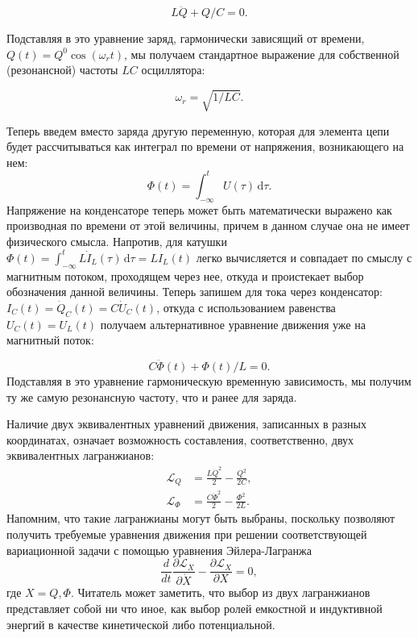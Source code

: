\documentclass[14pt, a4paper]{extreport}
\newcommand{\diff}{\,\mathrm{d}}
\numberwithin{equation}{section}
\begin{document}
\begin{equation}
L \ddot Q + Q/C = 0.
\end{equation}

Подставляя в это уравнение заряд, гармонически зависящий от времени, $Q(t) = Q^0 \cos(\omega_r t)$, мы получаем стандартное выражение для собственной (резонансной) частоты $LC$ осциллятора:

\begin{equation}
	\omega_r = \sqrt{1/LC}.
\end{equation}

Теперь введем вместо заряда другую переменную, которая для элемента цепи будет рассчитываться как интеграл по времени от напряжения, возникающего на нем:
\begin{equation}
	\Phi(t) = \int_{-\infty}^{t} U(\tau) \diff \tau.
\end{equation}
Напряжение на конденсаторе теперь может быть математически выражено как производная по времени от этой величины, причем в данном случае она не имеет физического смысла. Напротив, для катушки $\Phi(t) = \int_{-\infty}^{t} L \dot I_L(\tau) \diff \tau = LI_L(t)	$  легко вычисляется и совпадает по смыслу с магнитным потоком, проходящем через нее, откуда и проистекает выбор обозначения данной величины. Теперь запишем для тока через конденсатор: $I_C(t) = \dot Q_C(t) = C \dot U_C(t)$, откуда с использованием равенства $U_C(t) = U_L(t)$ получаем альтернативное уравнение движения уже на магнитный поток:

\begin{equation}
	C \ddot \Phi(t) + \Phi(t)/L = 0.
\end{equation}
Подставляя в это уравнение гармоническую временную зависимость, мы получим ту же самую резонансную частоту, что и ранее для заряда.

Наличие двух эквивалентных уравнений движения, записанных в разных координатах, означает возможность составления, соответственно, двух эквивалентных лагранжианов:
\begin{align}
	\mathcal{L}_Q &= \frac{L \dot Q^2}{2} - \frac{Q^2}{2 C},\\
	\mathcal{L}_\Phi &= \frac{C\dot \Phi^2}{2} - \frac{\Phi^2}{2 L}.
\end{align}
Напомним, что такие лагранжианы могут быть выбраны, поскольку позволяют получить требуемые уравнения движения при решении соответствующей вариационной задачи с помощью уравнения Эйлера-Лагранжа
\begin{equation}
\frac{d}{d t}\frac{\partial \mathcal{L}_X}{\partial \dot X} - \frac{\partial \mathcal{L}_X}{\partial X} = 0,
\end{equation}
где $X = Q, \Phi$. Читатель может заметить, что выбор из двух лагранжианов представляет собой ни что иное, как выбор ролей емкостной и индуктивной энергий в качестве кинетической либо потенциальной. 
\end{document}
